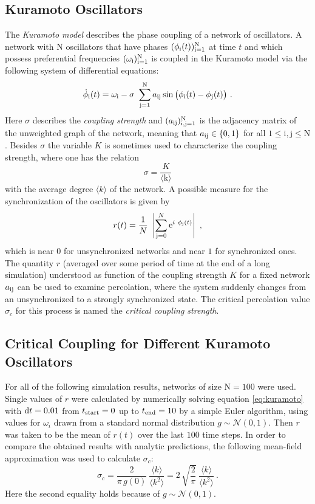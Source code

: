 \documentclass{scrartcl}
\begin{document}
\subsection{Kuramoto Oscillators}
The \emph{Kuramoto model} describes the phase coupling of a network of
oscillators. A network with $\mathrm{N}$ oscillators that have phases
$(\phi_{\mathrm{i}}(t))_{\mathrm{i=1}}^{\mathrm{N}}$ at time $t$ and which possess preferential
frequencies $(\omega_{\mathrm{i}})_{\mathrm{i=1}}^{\mathrm{N}}$ is coupled in the Kuramoto model via the
following system of differential equations:
\begin{equation}
    \label{eq:kuramoto}
    \dot{\phi}_{\mathrm{i}}(t) = \omega_{\mathrm{i}} - \sigma~\sum_{\mathrm{j=1}}^{\mathrm{N}} a_{\mathrm{ij}} \sin\big(\phi_{\mathrm{i}}(t) - \phi_{\mathrm{j}}(t)\big)~.
\end{equation}
Here $\sigma$ describes the \emph{coupling strength} and
$(a_{\mathrm{ij}})_{\mathrm{i,j=1}}^{\mathrm{N}}$ is the adjacency matrix of the unweighted graph of
the network, meaning that $a_{\mathrm{ij}} \in \{0, 1\}$ for all $1\le
\mathrm{i},\mathrm{j}\le \mathrm{N}$. Besides $\sigma$ the variable $K$
is sometimes used to characterize the coupling strength, where one has the
relation
\begin{equation}
    \sigma = \frac{K}{\mathrm{\langle k \rangle}}
\end{equation}
with the average degree $\langle k \rangle$ of the network.
A possible measure for the synchronization of the oscillators is given by
\begin{equation}
    r(t) = \frac{1}{N}~\left| \sum_{\mathrm{j=0}}^N \mathrm{e}^{i~\phi_{\mathrm{j}}(t)} \right|~,
\end{equation}
which is near $0$ for unsynchronized networks and near $1$ for synchronized
ones. The quantity $r$ (averaged over some period of time at the end of
a long simulation) understood as function of the coupling strength
$K$ for a fixed network $a_{\mathrm{ij}}$ can be used to examine percolation, where
the system suddenly changes from an unsynchronized to a strongly
synchronized state. The critical percolation value $\sigma_c$ for this process is named
the \emph{critical coupling strength}.


\subsection{Critical Coupling for Different Kuramoto Oscillators}
For all of the following simulation results, networks of size $\mathrm{N}=100$ were used.
Single values of $r$ were calculated by numerically solving equation
\eqref{eq:kuramoto} with $\mathrm{d} t=0.01$ from $t_{\mathrm{start}} = 0$ up to
$t_{\mathrm{end}} = 10$ by a simple Euler algorithm, using
values for $\omega_i$ drawn from a standard normal distribution $g \sim
\mathcal{N}(0, 1)$. Then $r$ was taken to be the mean of $r(t)$ over the
last $100$ time steps. 
In order to compare the obtained results with analytic predictions, the
following mean-field approximation was used to calculate $\sigma_c$:
\begin{equation}\label{eq:s_crit}
    \sigma_c = \frac{2}{\pi\,g(0)}~\frac{\langle k \rangle}{\langle k^2 \rangle} = 2\,\sqrt{\frac{2}{\pi}}~\frac{\langle k \rangle}{\langle k^2 \rangle}~.
\end{equation}
Here the second equality holds because of $g \sim \mathcal{N}(0, 1)$.
\end{document}
